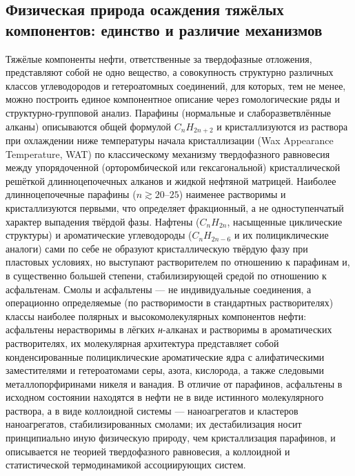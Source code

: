 \documentclass[11pt]{extarticle}
\begin{document}
\subsection{Физическая природа осаждения тяжёлых компонентов: единство и различие механизмов}\label{ux444ux438ux437ux438ux447ux435ux441ux43aux430ux44f-ux43fux440ux438ux440ux43eux434ux430-ux43eux441ux430ux436ux434ux435ux43dux438ux44f-ux442ux44fux436ux451ux43bux44bux445-ux43aux43eux43cux43fux43eux43dux435ux43dux442ux43eux432-ux435ux434ux438ux43dux441ux442ux432ux43e-ux438-ux440ux430ux437ux43bux438ux447ux438ux435-ux43cux435ux445ux430ux43dux438ux437ux43cux43eux432}

Тяжёлые компоненты нефти, ответственные за твердофазные отложения, представляют собой не одно вещество, а совокупность структурно различных классов углеводородов и гетероатомных соединений, для которых, тем не менее, можно построить единое компонентное описание через гомологические ряды и структурно-групповой анализ. Парафины (нормальные и слаборазветвлённые алканы) описываются общей формулой \(C_nH_{2n+2}\) и кристаллизуются из раствора при охлаждении ниже температуры начала кристаллизации (Wax Appearance Temperature, WAT) по классическому механизму твердофазного равновесия между упорядоченной (орторомбической или гексагональной) кристаллической решёткой длинноцепочечных алканов и жидкой нефтяной матрицей. Наиболее длинноцепочечные парафины (\(n \gtrsim 20\)--\(25\)) наименее растворимы и кристаллизуются первыми, что определяет фракционный, а не одноступенчатый характер выпадения твёрдой фазы. Нафтены (\(C_nH_{2n}\), насыщенные циклические структуры) и ароматические углеводороды (\(C_nH_{2n-6}\) и их полициклические аналоги) сами по себе не образуют кристаллическую твёрдую фазу при пластовых условиях, но выступают растворителем по отношению к парафинам и, в существенно большей степени, стабилизирующей средой по отношению к асфальтенам. Смолы и асфальтены --- не индивидуальные соединения, а операционно определяемые (по растворимости в стандартных растворителях) классы наиболее полярных и высокомолекулярных компонентов нефти: асфальтены нерастворимы в лёгких \emph{н}-алканах и растворимы в ароматических растворителях, их молекулярная архитектура представляет собой конденсированные полициклические ароматические ядра с алифатическими заместителями и гетероатомами серы, азота, кислорода, а также следовыми металлопорфиринами никеля и ванадия. В отличие от парафинов, асфальтены в исходном состоянии находятся в нефти не в виде истинного молекулярного раствора, а в виде коллоидной системы --- наноагрегатов и кластеров наноагрегатов, стабилизированных смолами; их дестабилизация носит принципиально иную физическую природу, чем кристаллизация парафинов, и описывается не теорией твердофазного равновесия, а коллоидной и статистической термодинамикой ассоциирующих систем.
\end{document}
